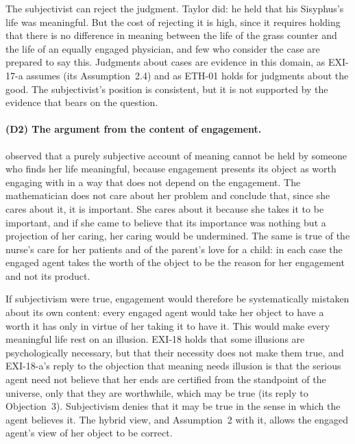The subjectivist can reject the judgment. Taylor did: he held that his Sisyphus's life was meaningful. But the cost of rejecting it is high, since it requires holding that there is no difference in meaning between the life of the grass counter and the life of an equally engaged physician, and few who consider the case are prepared to say this. Judgments about cases are evidence in this domain, as EXI-17-a assumes (its Assumption~2.4) and as ETH-01 holds for judgments about the good. The subjectivist's position is consistent, but it is not supported by the evidence that bears on the question.

\paragraph{(D2) The argument from the content of engagement.} \citet{Wiggins1976} observed that a purely subjective account of meaning cannot be held by someone who finds her life meaningful, because engagement presents its object as worth engaging with in a way that does not depend on the engagement. The mathematician does not care about her problem and conclude that, since she cares about it, it is important. She cares about it because she takes it to be important, and if she came to believe that its importance was nothing but a projection of her caring, her caring would be undermined. The same is true of the nurse's care for her patients and of the parent's love for a child: in each case the engaged agent takes the worth of the object to be the reason for her engagement and not its product.

If subjectivism were true, engagement would therefore be systematically mistaken about its own content: every engaged agent would take her object to have a worth it has only in virtue of her taking it to have it. This would make every meaningful life rest on an illusion. EXI-18 holds that some illusions are psychologically necessary, but that their necessity does not make them true, and EXI-18-a's reply to the objection that meaning needs illusion is that the serious agent need not believe that her ends are certified from the standpoint of the universe, only that they are worthwhile, which may be true (its reply to Objection~3). Subjectivism denies that it may be true in the sense in which the agent believes it. The hybrid view, and Assumption~2 with it, allows the engaged agent's view of her object to be correct.

